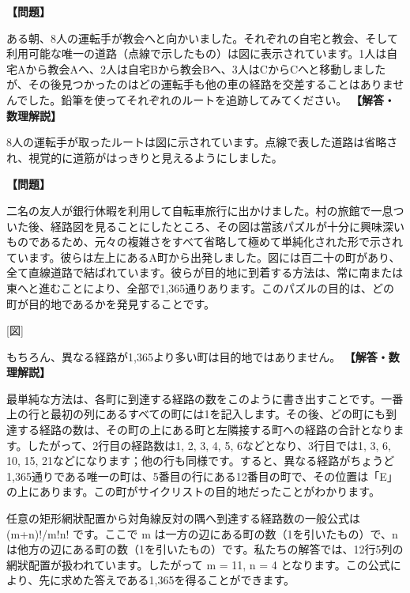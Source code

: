 \documentclass[10pt,a4paper,oneside,openany]{ltjsbook}
\begin{document}
\begin{tcolorbox}[colback=softblue,colframe=primaryblue,title=\textbf{第 252 問：自動車運転手たちへのパズル （原題: A PUZZLE FOR MOTORISTS.）},arc=2mm,boxrule=1pt,breakable]
\textbf{【問題】}\par\vspace{0.3em}
ある朝、8人の運転手が教会へと向かいました。それぞれの自宅と教会、そして利用可能な唯一の道路（点線で示したもの）は図に表示されています。1人は自宅Aから教会Aへ、2人は自宅Bから教会Bへ、3人はCからCへと移動しましたが、その後見つかったのはどの運転手も他の車の経路を交差することはありませんでした。鉛筆を使ってそれぞれのルートを追跡してみてください。
\tcblower
\textbf{【解答・数理解説】}\par\vspace{0.3em}
8人の運転手が取ったルートは図に示されています。点線で表した道路は省略され、視覚的に道筋がはっきりと見えるようにしました。
\end{tcolorbox}

\begin{tcolorbox}[colback=softblue,colframe=primaryblue,title=\textbf{第 253 問：A BANK HOLIDAY PUZZLE.},arc=2mm,boxrule=1pt,breakable]
\textbf{【問題】}\par\vspace{0.3em}

二名の友人が銀行休暇を利用して自転車旅行に出かけました。村の旅館で一息ついた後、経路図を見ることにしたところ、その図は當該パズルが十分に興味深いものであるため、元々の複雑さをすべて省略して極めて単純化された形で示されています。彼らは左上にあるA町から出発しました。図には百二十の町があり、全て直線道路で結ばれています。彼らが目的地に到着する方法は、常に南または東へと進むことにより、全部で1,365通りあります。このパズルの目的は、どの町が目的地であるかを発見することです。

[図]

もちろん、異なる経路が1,365より多い町は目的地ではありません。
\tcblower
\textbf{【解答・数理解説】}\par\vspace{0.3em}
最単純な方法は、各町に到達する経路の数をこのように書き出すことです。一番上の行と最初の列にあるすべての町には1を記入します。その後、どの町にも到達する経路の数は、その町の上にある町と左隣接する町への経路の合計となります。したがって、2行目の経路数は1, 2, 3, 4, 5, 6などとなり、3行目では1, 3, 6, 10, 15, 21などになります；他の行も同様です。すると、異なる経路がちょうど1,365通りである唯一の町は、5番目の行にある12番目の町で、その位置は「E」の上にあります。この町がサイクリストの目的地だったことがわかります。

任意の矩形網狀配置から対角線反対の隅へ到達する経路数の一般公式は (m+n)!/m!n! です。ここで m は一方の辺にある町の数（1を引いたもの）で、n は他方の辺にある町の数（1を引いたもの）です。私たちの解答では、12行5列の網狀配置が扱われています。したがって m = 11, n = 4 となります。この公式により、先に求めた答えである1,365を得ることができます。
\end{tcolorbox}
\end{document}
